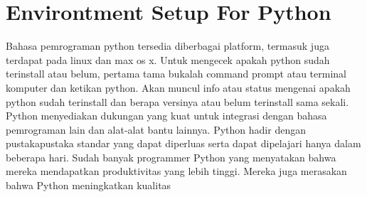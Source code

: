 \section{Environtment Setup For Python}
Bahasa pemrograman python tersedia diberbagai platform, termasuk juga terdapat pada 
linux dan max os x. Untuk mengecek apakah python sudah terinstall atau belum, pertama 
tama bukalah command prompt atau terminal komputer dan ketikan python. Akan muncul info 
atau status mengenai apakah python sudah terinstall dan berapa versinya atau belum terinstall sama sekali.
Python menyediakan dukungan yang kuat untuk integrasi dengan bahasa pemrograman lain dan alat-alat bantu lainnya. 
Python hadir dengan pustakapustaka standar yang dapat diperluas serta dapat dipelajari hanya dalam beberapa hari.
Sudah banyak programmer Python yang menyatakan bahwa mereka mendapatkan produktivitas yang lebih tinggi. 
Mereka juga merasakan bahwa Python meningkatkan kualitas 
